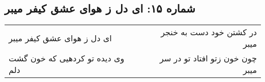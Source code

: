 \begin{center}
\section*{شماره ۱۵: ای دل ز هوای عشق کیفر میبر}
\label{sec:015}
\begin{longtable}{l p{0.5cm} r}
ای دل ز هوای عشق کیفر میبر
&&
در کشتن خود دست به خنجر میبر
\\
وی دیده تو کردهیی که خون گشت دلم
&&
چون خون زتو افتاد تو در سر میبر
\\
\end{longtable}
\end{center}
